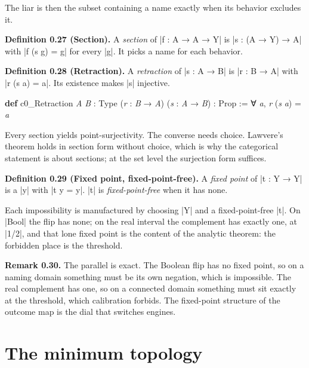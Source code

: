 \documentclass{memoir}
\begin{document}
The liar is then the subset containing a name exactly when its behavior excludes
it.

\textbf{Definition 0.27 (Section).} A \emph{section} of \LeanVerb|f : A → A → Y| is
\LeanVerb|s : (A → Y) → A| with \LeanVerb|f (s g) = g| for every \LeanVerb|g|. It picks a name for each
behavior.

\textbf{Definition 0.28 (Retraction).} A \emph{retraction} of \LeanVerb|s : A → B| is \LeanVerb|r : B → A| with
\LeanVerb|r (s a) = a|. Its existence makes \LeanVerb|s| injective.

\begin{LeanVerbatim}
\textbf{def} c0_Retraction \textit{A} \textit{B} : Type (\textit{r} : \textit{B} → \textit{A})
    (\textit{s} : \textit{A} → \textit{B}) : Prop := ∀ \textit{a}, \textit{r} (\textit{s} \textit{a}) = \textit{a}

\end{LeanVerbatim}


Every section yields point-surjectivity. The converse needs choice. Lawvere's
theorem holds in section form without choice, which is why the categorical
statement is about sections; at the set level the surjection form suffices.

\textbf{Definition 0.29 (Fixed point, fixed-point-free).} A \emph{fixed point} of \LeanVerb|t : Y → Y|
is a \LeanVerb|y| with \LeanVerb|t y = y|. \LeanVerb|t| is \emph{fixed-point-free} when it has none.

Each impossibility is manufactured by choosing \LeanVerb|Y| and a fixed-point-free \LeanVerb|t|.
On \LeanVerb|Bool| the flip has none; on the real interval the complement has exactly
one, at \LeanVerb|1/2|, and that lone fixed point is the content of the analytic theorem:
the forbidden place is the threshold.

\textbf{Remark 0.30.} The parallel is exact. The Boolean flip has no fixed point, so on
a naming domain something must be its own negation, which is impossible. The
real complement has one, so on a connected domain something must sit exactly at
the threshold, which calibration forbids. The fixed-point structure of the
outcome map is the dial that switches engines.



\section{The minimum topology}\label{Two--Schemas--of--Impossibility-005F-005F-005F--Machine--Checked--Limits--of--Trustworthy--Machine--Learning-005F-005F-005F--and--Why--They--Tighten--with--Capability----Preliminaries----The--minimum--topology}
\end{document}
